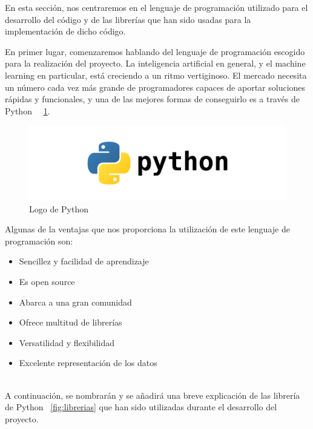 \documentclass[conference,a4paper]{IEEEtran}
\begin{document}
En esta sección, nos centraremos en el lenguaje de programación utilizado para el desarrollo del código y de las librerías que han sido usadas para la implementación de dicho código.

En primer lugar, comenzaremos hablando del lenguaje de programación escogido para la realización del proyecto. La inteligencia artificial en general, y el machine learning en particular, está creciendo a un ritmo vertiginoso. El mercado necesita un número cada vez más grande de programadores capaces de aportar soluciones rápidas y funcionales, y una de las mejores formas de conseguirlo es a través de Python~\cite{b11} ~\ref{fig:python}. 

\begin{figure}
  \centering
  \includegraphics[scale=0.25]{python}
  \caption{Logo de Python}
  \label{fig:python}
\end{figure} 



Algunas de la ventajas que nos proporciona la utilización de este lenguaje de programación son:

\begin{itemize}
\item Sencillez y facilidad de aprendizaje
\item Es open source
\item Abarca a una gran comunidad
\item Ofrece multitud de librerías
\item Versatilidad y flexibilidad
\item Excelente representación de los datos
\end{itemize}
~\cite{b11}
\\




A continuación, se nombrarán y se añadirá una breve explicación de las librería de Python ~\ref{fig:librerias} que han sido utilizadas durante el desarrollo del proyecto. 
\end{document}
